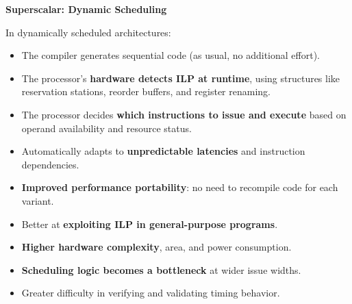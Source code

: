 \highspace
\begin{flushleft}
    \textcolor{Green3}{ \textbf{Superscalar: Dynamic Scheduling}}
\end{flushleft}
In dynamically scheduled architectures:
\begin{itemize}
    \item The compiler generates sequential code (as usual, no additional effort).
    \item The processor's \textbf{hardware detects ILP at runtime}, using structures like reservation stations, reorder buffers, and register renaming.
    \item The processor decides \textbf{which instructions to issue and execute} based on operand availability and resource status.
    \item[\textcolor{Green3}{\faIcon{check}}] Automatically adapts to \textcolor{Green3}{\textbf{unpredictable latencies}} and instruction dependencies.
    \item[\textcolor{Green3}{\faIcon{check}}] \textcolor{Green3}{\textbf{Improved performance portability}}: no need to recompile code for each variant.
    \item[\textcolor{Green3}{\faIcon{check}}] Better at \textcolor{Green3}{\textbf{exploiting ILP in general-purpose programs}}.
    \item[\textcolor{Red2}{\faIcon{times}}] \textcolor{Red2}{\textbf{Higher hardware complexity}}, area, and power consumption.
    \item[\textcolor{Red2}{\faIcon{times}}] \textcolor{Red2}{\textbf{Scheduling logic becomes a bottleneck}} at wider issue widths.
    \item[\textcolor{Red2}{\faIcon{times}}] Greater difficulty in verifying and validating timing behavior.
\end{itemize}

